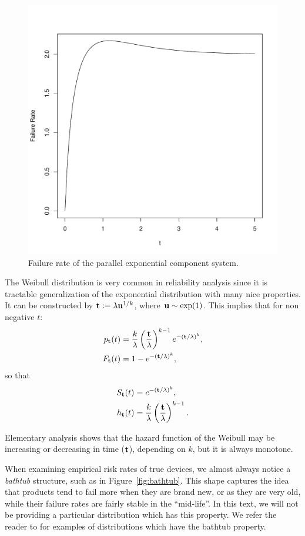 \begin{figure}[ht]
\centering
\includegraphics[width=0.5\linewidth]{art/hazard}
\caption{Failure rate of the parallel exponential component system.}
\label{fig:hazard_non_monotone}
\end{figure}





\begin{example}
The Weibull distribution is very common in reliability analysis since it is tractable generalization of the exponential distribution with many nice properties. 
It can be constructed by 
$\mathbf{t} := \lambda \mathbf{u}^{1/k}$, where $\mathbf{u} \sim \exp(1)$. 
This implies that for non negative $t$:
\begin{align}
	p_{\mathbf{t}} (t) &= \frac{k}{\lambda}\left(\frac{\mathbf{t}}{\lambda} \right)^{k-1} e^{-(\mathbf{t}/\lambda)^k}, \\
	F_{\mathbf{t}} (t) &= 1 - e^{-(\mathbf{t}/\lambda)^k},
\end{align}
so that 
\begin{align}
	S_{\mathbf{t}} (t) &= e^ {-(\mathbf{t}/\lambda )^k}, \\
	h_{\mathbf{t}} (t) &= \frac{k}{\lambda} \left(\frac{\mathbf{t}}{\lambda} \right)^{k-1} .
\end{align}
\end{example}
Elementary analysis shows that the hazard function of the Weibull may be increasing or decreasing in time ($\mathbf{t}$), depending on $k$, but it is always monotone.




\begin{example}
When examining empirical risk rates of true devices, we almost always notice a \emph{bathtub} structure, such as in Figure~\ref{fig:bathtub}.
This shape captures the idea that products tend to fail more when they are brand new, or as they are very old, while their failure rates are fairly stable in the ``mid-life''.
In this text, we will not be providing a particular distribution which has this property. 
We refer the reader to \cite{nadarajah_bathtub-shaped_2008} for examples of distributions which have the bathtub property.
\end{example}


